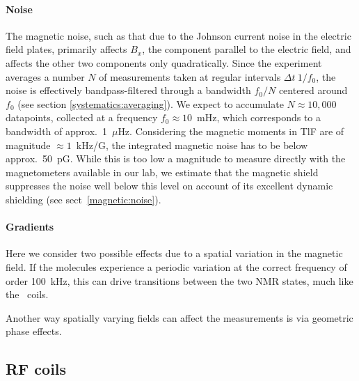 
\paragraph{Noise}

The magnetic noise, such as that due to the Johnson current noise in the
electric field plates, primarily affects $B_x$, the component parallel to the
electric field, and affects the other two components only quadratically. Since
the experiment averages a number $N$ of measurements taken at regular intervals
$\Delta t~1/f_0$, the noise is effectively bandpass-filtered through a bandwidth
$f_0/N$ centered around $f_0$ (see section \ref{systematics:averaging}). We
expect to accumulate $N\approx10,000$ datapoints, collected at a frequency
$f_0\approx10$~mHz, which corresponds to a bandwidth of approx.\ 1~$\mu$Hz.
Considering the magnetic moments in TlF are of magnitude $\approx1$~kHz/G, the
integrated magnetic noise has to be below approx.\ 50~pG. While this is too low
a magnitude to measure directly with the magnetometers available in our lab, we
estimate that the magnetic shield suppresses the noise well below this level on
account of its excellent dynamic shielding (see sect~\ref{magnetic:noise}).

\paragraph{Gradients}

Here we consider two possible effects due to a spatial variation in the magnetic
field. If the molecules experience a periodic variation at the correct frequency
of order 100~kHz, this can drive transitions between the two \gls{NMR} states, much
like the \RF\ coils.

Another way spatially varying fields can affect the measurements is via
geometric phase effects.

\subsection{RF coils}

